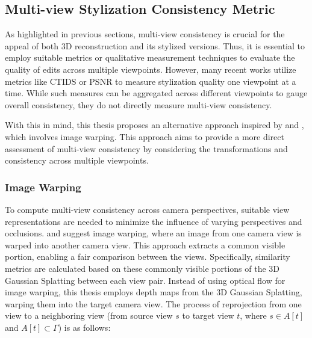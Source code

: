 \subsection{Multi-view Stylization Consistency Metric} \label{sec:metric}

As highlighted in previous sections, multi-view consistency is crucial for the appeal of both 3D reconstruction and its stylized versions. Thus, it is essential to employ suitable metrics or qualitative measurement techniques to evaluate the quality of edits across multiple viewpoints. However, many recent works utilize metrics like CTIDS or PSNR to measure stylization quality one viewpoint at a time. While such measures can be aggregated across different viewpoints to gauge overall consistency, they do not directly measure multi-view consistency. 

With this in mind, this thesis proposes an alternative approach inspired by \textcite{Mu.2021} and \textcite{Liu.2024}, which involves image warping. This approach aims to provide a more direct assessment of multi-view consistency by considering the transformations and consistency across multiple viewpoints.



\subsubsection{Image Warping}

To compute multi-view consistency across camera perspectives, suitable view representations are needed to minimize the influence of varying perspectives and occlusions. \textcite{Mu.2021} and \textcite{Liu.2024} suggest image warping, where an image from one camera view is warped into another camera view. This approach extracts a common visible portion, enabling a fair comparison between the views. Specifically, similarity metrics are calculated based on these commonly visible portions of the 3D Gaussian Splatting between each view pair. Instead of using optical flow for image warping, this thesis employs depth maps from the 3D Gaussian Splatting, warping them into the target camera view. The process of reprojection from one view to a neighboring view (from source view $s$ to target view $t$, where $s \in A[t] $ and $A[t] \subset \varGamma$) is as follows:

